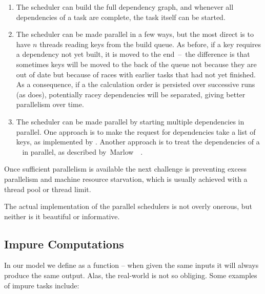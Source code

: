 \begin{enumerate}
\item The  scheduler can build the full dependency graph, and
whenever all dependencies of a task are complete, the task itself can be
started.

\item The  scheduler can be made parallel in a few ways, but the
most direct is to have $n$ threads reading keys from the build queue. As before,
if a key requires a dependency not yet built, it is moved to the end~--~the
difference is that sometimes keys will be moved to the back of the queue not
because they are out of date but because of races with earlier tasks that had
not yet finished. As a consequence, if a the calculation order is persisted over
successive runs (as \Excel does), potentially racey dependencies will be
separated, giving better parallelism over time.

\item The  scheduler can be made parallel by starting multiple
dependencies in parallel. One approach is to make the request for dependencies
take a list of keys, as implemented by \Shake. Another approach is to treat the
 dependencies of a ~ in parallel, as
described by~Marlow~\etal~.
\end{enumerate}

Once sufficient parallelism is available the next challenge is preventing excess
parallelism and machine resource starvation, which is usually achieved with a
thread pool or thread limit.

The actual implementation of the parallel schedulers is not overly onerous,
but neither is it beautiful or informative.


\subsection{Impure Computations}\label{sec-non-determinism}

In our model we define  as a function -- when given the same inputs
it will always produce the same output. Alas, the real-world is not so obliging.
Some examples of impure tasks include:

